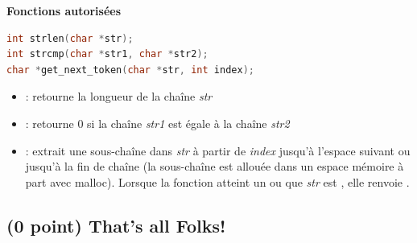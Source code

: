 \documentclass[11pt,a4paper]{article}
\begin{document}
\vspace*{-0.5cm}


\noindent \textbf{Fonctions autorisées}

\medskip

\begin{lstlisting}[language=C,commentstyle=\color{commentgreen}]
int strlen(char *str);
int strcmp(char *str1, char *str2);
char *get_next_token(char *str, int index);
\end{lstlisting}

\vspace*{-0.5cm}

\begin{itemize}
\item {} : retourne la longueur de la chaîne \textit{str}
\item {} : retourne 0 si la chaîne \textit{str1} est égale à la chaîne \textit{str2}
\item {} : extrait une sous-chaîne dans \textit{str} à partir de \textit{index} jusqu'à l'espace suivant ou jusqu'à la fin de chaîne (la sous-chaîne est allouée dans un espace mémoire à part avec malloc). Lorsque la fonction atteint un  ou que \textit{str} est , elle renvoie .
\end{itemize}


\begin{center}
\end{center}



\subsection{(0 point) That's all Folks!}
\end{document}

